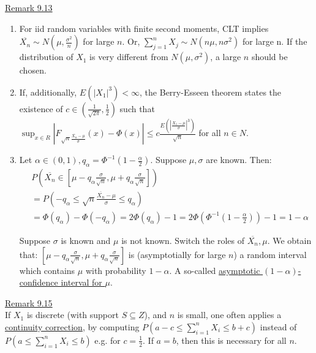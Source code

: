\documentclass[10pt,letterpaper]{article}
\begin{document}
\underline{Remark 9.13}\\

				\begin{enumerate}
					\item For iid random variables with finite second moments, CLT implies $\overline{X_n}\sim N(\mu, \frac{\sigma^2}{n})$ for large $n$. Or, $\sum_{j=1}^nX_j\sim N(n\mu, n\sigma^2)$ for large n. If the distribution of $X_1$ is very different from $N(\mu, \sigma^2)$, a large $n$ should be chosen.
					
					\item If, additionally, $E(|X_1|^3)<\infty$, the Berry-Esseen theorem states the existence of $c\in(\frac{1}{\sqrt{2\pi}}, \frac{1}{2})$ such that $\sup_{x\in R}|F_{\sqrt{n}\frac{\overline{X_n}-\mu}{\sigma}}(x)-\Phi(x)|\leq c\frac{E(|\frac{X_1-\mu}{\sigma}|^3)}{\sqrt{n}}$ for all $n\in N$.
				
				\item Let $\alpha\in(0,1), q_\alpha=\Phi^{-1}(1-\frac{\alpha}{2})$. Suppose $\mu,\sigma$ are known. Then:
				\begin{align*}
				  &P(\overline{X_n}\in[\mu-q_\alpha\frac{\sigma}{\sqrt{n}}, \mu+q_\alpha\frac{\sigma}{\sqrt{n}}])\\
				  &=P(-q_\alpha\leq\sqrt{n}\frac{\overline{X_n}-\mu}{\sigma}\leq q_\alpha)\\
				  &=\Phi(q_\alpha)-\Phi(-q_\alpha)
				  =2\Phi(q_\alpha)-1
				  =2\Phi(\Phi^{-1}(1-\frac{\alpha}{2}))-1
				  =1-\alpha
				\end{align*}

Suppose $\sigma$ is known and $\mu$ is not known. Switch the roles of $\overline{X_n}, \mu$. We obtain that: $[\mu-q_\alpha\frac{\sigma}{\sqrt{n}}, \mu+q_\alpha\frac{\sigma}{\sqrt{n}}]$ is (asymptotially for large $n$) a random interval which contains $\mu$ with probability $1-\alpha$. A so-called \underline{asymptotic $(1-\alpha)$-confidence interval for $\mu$}.\\

				\end{enumerate}

\underline{Remark 9.15}\\

If $X_1$ is discrete (with support $S\subseteq Z$), and $n$ is small, one often applies a \underline{continuity correction}, by computing $P(a-c\leq\sum_{i=1}^{n}X_i\leq b+c)$ instead of $P(a\leq\sum_{i=1}^{n}X_i\leq b)$ e.g. for $c=\frac{1}{2}$. If $a=b$, then this is necessary for all $n$.
\end{document}
